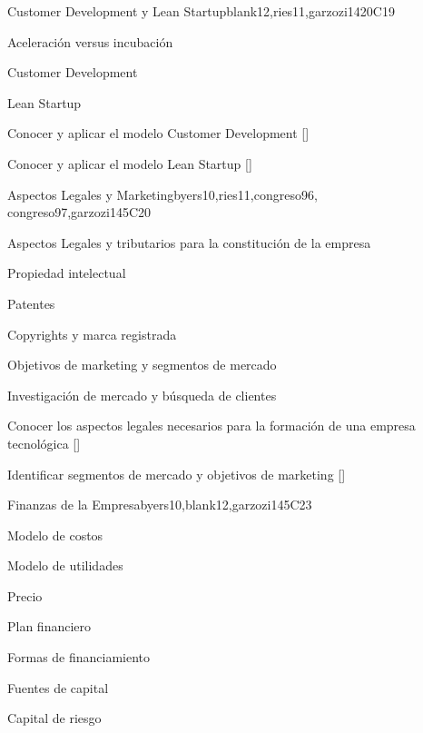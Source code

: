 \begin{syllabus}
\begin{unit}{}{Customer Development y Lean Startup}{blank12,ries11,garzozi14}{20}{C19}
	\begin{topics}
      \item Aceleración versus incubación  
      \item Customer Development
      \item Lean Startup 
   \end{topics}

   \begin{learningoutcomes} 
      \item Conocer y aplicar el modelo Customer Development  [\Usage]
      \item Conocer y aplicar el modelo Lean Startup  [\Usage]
    \end{learningoutcomes} 
\end{unit}

\begin{unit}{}{Aspectos Legales y Marketing}{byers10,ries11,congreso96, congreso97,garzozi14}{5}{C20}
	\begin{topics}
	  \item Aspectos Legales y tributarios para la constitución de la empresa
      \item Propiedad intelectual
      \item Patentes
      \item Copyrights y marca registrada
      \item Objetivos de marketing  y segmentos de mercado
      \item Investigación de mercado y búsqueda de clientes
   \end{topics}

  \begin{learningoutcomes} 
      \item Conocer los aspectos legales necesarios para la formación de una empresa tecnológica  [\Familiarity]
      \item Identificar segmentos de mercado y objetivos de marketing     [\Familiarity]
   \end{learningoutcomes} 
\end{unit}

\begin{unit}{}{Finanzas de la Empresa}{byers10,blank12,garzozi14}{5}{C23}
	\begin{topics}
      \item Modelo de costos
      \item Modelo de utilidades
      \item Precio
      \item Plan financiero
      \item Formas de financiamiento
      \item Fuentes de capital
      \item Capital de riesgo
   \end{topics}


\end{unit}
\end{syllabus}
